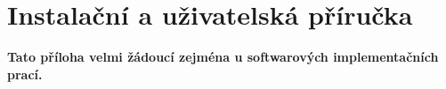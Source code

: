 \chapter{Instalační a uživatelská příručka}
\textbf{\large Tato příloha velmi žádoucí zejména u softwarových implementačních prací.}
